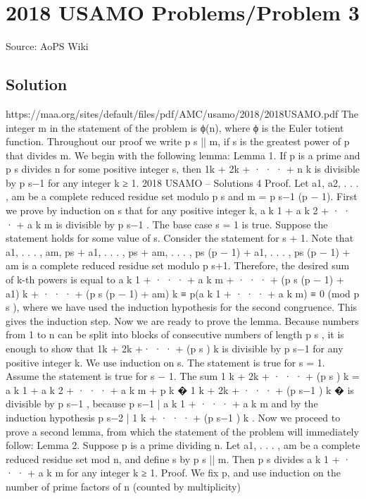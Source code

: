 \documentclass[12pt]{article}
\begin{document}
\section*{{2018 USAMO Problems/Problem 3}}
Source: AoPS Wiki

\subsection*{Solution}
https://maa.org/sites/default/files/pdf/AMC/usamo/2018/2018USAMO.pdf The integer m in the statement of the problem is ϕ(n), where ϕ is the Euler totient function.
Throughout our proof we write p
s
|| m, if s is the greatest power of p that divides m.
We begin with the following lemma:
Lemma 1. If p is a prime and p
s divides n for some positive integer s, then 1k + 2k + · · · + n
k
is
divisible by p
s−1
for any integer k ≥ 1.
2018 USAMO – Solutions 4
Proof. Let {a1, a2, . . . , am} be a complete reduced residue set modulo p
s and m = p
s−1
(p − 1).
First we prove by induction on s that for any positive integer k, a
k
1 + a
k
2 + · · · + a
k
m is divisible by
p
s−1
. The base case s = 1 is true. Suppose the statement holds for some value of s. Consider the
statement for s + 1. Note that
{a1, . . . , am, ps + a1, . . . , ps + am, . . . , ps
(p − 1) + a1, . . . , ps
(p − 1) + am}
is a complete reduced residue set modulo p
s+1. Therefore, the desired sum of k-th powers is equal
to
a
k
1 + · · · + a
k
m + · · · + (p
s
(p − 1) + a1)
k + · · · + (p
s
(p − 1) + am)
k ≡ p(a
k
1 + · · · + a
k
m) ≡ 0 (mod p
s
),
where we have used the induction hypothesis for the second congruence. This gives the induction
step.
Now we are ready to prove the lemma. Because numbers from 1 to n can be split into blocks of
consecutive numbers of length p
s
, it is enough to show that 1k + 2k +· · · + (p
s
)
k
is divisible by p
s−1
for any positive integer k. We use induction on s. The statement is true for s = 1. Assume the
statement is true for s − 1. The sum
1
k + 2k + · · · + (p
s
)
k = a
k
1 + a
k
2 + · · · + a
k
m + p
k
�
1
k + 2k + · · · + (p
s−1
)
k
�
is divisible by p
s−1
, because p
s−1
| a
k
1 + · · · + a
k
m and by the induction hypothesis p
s−2
| 1
k + · · · +
(p
s−1
)
k
.
Now we proceed to prove a second lemma, from which the statement of the problem will immediately
follow:
Lemma 2. Suppose p is a prime dividing n. Let {a1, . . . , am} be a complete reduced residue set
mod n, and define s by p
s
|| m. Then p
s divides a
k
1 + · · · + a
k
m for any integer k ≥ 1.
Proof. We fix p, and use induction on the number of prime factors of n (counted by multiplicity)
\end{document}
